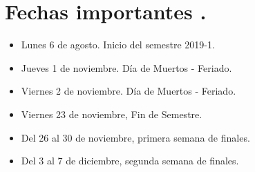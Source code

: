 \documentclass[12pt]{article}
\begin{document}
\renewcommand{\refname}{Bibliografía básica.}
\nocite{*}



\section{Fechas importantes .}
\begin{itemize}
\item Lunes 6 de agosto. Inicio del semestre 2019-1.
\item Jueves 1 de noviembre. Día de Muertos - Feriado.
\item Viernes 2 de noviembre. Día de Muertos - Feriado.
\item Viernes 23 de noviembre, Fin de Semestre.
\item Del 26 al 30 de noviembre, primera semana de finales.
\item Del 3 al 7 de diciembre,  segunda semana de finales.
\end{itemize}
\end{document}
